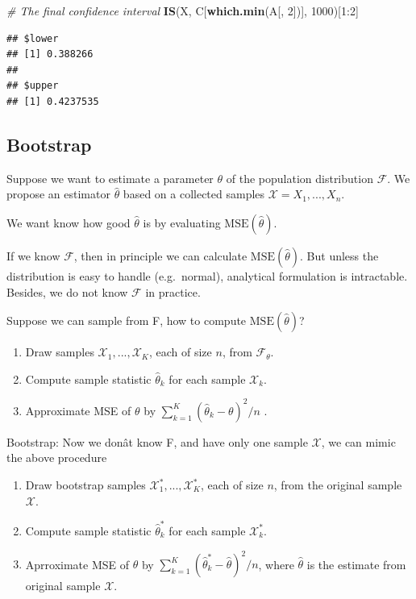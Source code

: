 \documentclass[]{article}
\newenvironment{Shaded}{\begin{snugshade}}{\end{snugshade}}
\newcommand{\KeywordTok}[1]{\textcolor[rgb]{0.13,0.29,0.53}{\textbf{{#1}}}}
\newcommand{\DecValTok}[1]{\textcolor[rgb]{0.00,0.00,0.81}{{#1}}}
\newcommand{\CommentTok}[1]{\textcolor[rgb]{0.56,0.35,0.01}{\textit{{#1}}}}
\newcommand{\NormalTok}[1]{{#1}}
\providecommand{\tightlist}{%
  \setlength{\itemsep}{0pt}\setlength{\parskip}{0pt}}
\begin{document}
\begin{Shaded}
\begin{Highlighting}[]
\CommentTok{# The final confidence interval}
\KeywordTok{IS}\NormalTok{(X, C[}\KeywordTok{which.min}\NormalTok{(A[, }\DecValTok{2}\NormalTok{])], }\DecValTok{1000}\NormalTok{)[}\DecValTok{1}\NormalTok{:}\DecValTok{2}\NormalTok{]}
\end{Highlighting}
\end{Shaded}

\begin{verbatim}
## $lower
## [1] 0.388266
## 
## $upper
## [1] 0.4237535
\end{verbatim}

\subsection{Bootstrap}\label{bootstrap}

Suppose we want to estimate a parameter \(\theta\) of the population
distribution \(\mathcal{F}\). We propose an estimator \(\hat\theta\)
based on a collected samples \(\mathcal{X} = {X_1 , ... , X_n}\).

We want know how good \(\hat\theta\) is by evaluating
\(\mathrm{MSE}(\hat\theta)\).

If we know \(\mathcal{F}\), then in principle we can calculate
\(\mathrm{MSE}(\hat\theta)\). But unless the distribution is easy to
handle (e.g.~normal), analytical formulation is intractable. Besides, we
do not know \(\mathcal{F}\) in practice.

Suppose we can sample from F, how to compute
\(\mathrm{MSE}(\hat\theta)\)?

\begin{enumerate}
\def\labelenumi{\arabic{enumi}.}
\tightlist
\item
  Draw samples \(\mathcal{X}_1 , ... , \mathcal{X}_K\), each of size
  \(n\), from \(\mathcal{F}_\theta\).
\item
  Compute sample statistic \(\hat\theta_k\) for each sample
  \(\mathcal{X}_k\).
\item
  Approximate MSE of \(\theta\) by
  \(\sum_{k=1}^K (\hat\theta_k - \theta)^2/n\) .
\end{enumerate}

Bootstrap: Now we donât know F, and have only one sample
\(\mathcal{X}\), we can mimic the above procedure

\begin{enumerate}
\def\labelenumi{\arabic{enumi}.}
\tightlist
\item
  Draw bootstrap samples \(\mathcal{X}_1^* , ... , \mathcal{X}_K^*\),
  each of size \(n\), from the original sample \(\mathcal{X}\).
\item
  Compute sample statistic \(\hat\theta_k^*\) for each sample
  \(\mathcal{X}_k^*\).
\item
  Aprroximate MSE of \(\theta\) by
  \(\sum_{k=1}^K (\hat\theta_k^* - \hat\theta)^2/n\), where
  \(\hat\theta\) is the estimate from original sample \(\mathcal{X}\).
\end{enumerate}
\end{document}
